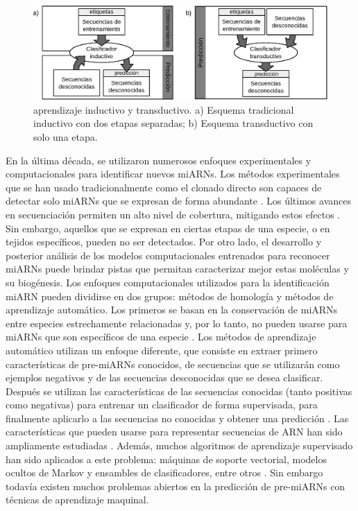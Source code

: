 \begin{figure}[tpb]
	\centering
	\includegraphics[width=\textwidth]{fig/paradigmas.eps}
	\caption[Aprendizaje inductivo vs. transductivo]{aprendizaje inductivo y transductivo. a) Esquema tradicional inductivo con dos etapas separadas; b)
	Esquema transductivo con solo una etapa.}
	\label{fig:schemes}
\end{figure}

En la última década, se utilizaron numerosos enfoques experimentales y computacionales para identificar nuevos miARNs. Los métodos experimentales que se
han usado tradicionalmente como el clonado directo son capaces de detectar solo miARNs que se expresan de forma abundante \citep{kleftogiannis2013where}. Los
últimos avances en secuenciación permiten un alto nivel de cobertura, mitigando estos efectos \citep{an2013mirdeep}. Sin embargo, aquellos que se expresan en
ciertas etapas de una especie, o en tejidos específicos, pueden no ser detectados. Por otro lado, el desarrollo y posterior análisis de los modelos
computacionales entrenados para reconocer miARNs puede brindar pistas que permitan caracterizar mejor estas moléculas y su biogénesis. Los enfoques
computacionales utilizados para la identificación miARN pueden dividirse en dos grupos: métodos de homología y métodos de aprendizaje automático. Los
primeros se basan en la conservación de miARNs entre especies estrechamente relacionadas y, por lo tanto, no pueden usarse para miARNs que son específicos de
una especie \citep{ng2007novo}. Los métodos de aprendizaje automático utilizan un enfoque diferente, que consiste en extraer primero características de
pre-miARNs conocidos, de secuencias que se utilizarán como ejemplos negativos y de las secuencias desconocidas que se desea clasificar. Después se utilizan
las características de las secuencias conocidas (tanto positivas como negativas) para entrenar un clasificador de forma supervisada, para finalmente aplicarlo
a las secuencias no conocidas y obtener una predicción \citep{kleftogiannis2013where}. Las características que pueden usarse para representar secuencias de
ARN han sido ampliamente estudiadas \citep{Lopes2014}. Además, muchos algoritmos de aprendizaje supervisado han sido aplicados a este problema: máquinas de
soporte vectorial, modelos ocultos de Markov y ensambles de clasificadores, entre otros \citep{kleftogiannis2013where}. Sin embargo todavía existen muchos
problemas abiertos en la predicción de pre-miARNs con técnicas de aprendizaje maquinal.

